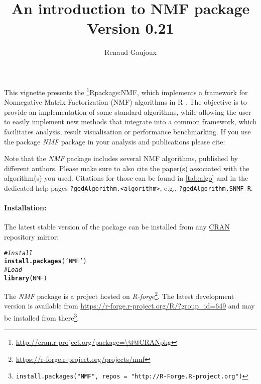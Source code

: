 \documentclass[a4paper]{article}\usepackage[]{graphicx}\usepackage[]{color}
\makeatletter
\newcommand{\hlstr}[1]{\textcolor[rgb]{0.192,0.494,0.8}{#1}}%
\newcommand{\hlcom}[1]{\textcolor[rgb]{0.678,0.584,0.686}{\textit{#1}}}%
\newcommand{\hlstd}[1]{\textcolor[rgb]{0.345,0.345,0.345}{#1}}%
\newcommand{\hlkwd}[1]{\textcolor[rgb]{0.737,0.353,0.396}{\textbf{#1}}}%
\newenvironment{kframe}{%
 \def\at@end@of@kframe{}%
 \ifinner\ifhmode%
  \def\at@end@of@kframe{\end{minipage}}%
  \begin{minipage}{\columnwidth}%
 \fi\fi%
 \def\FrameCommand##1{\hskip\@totalleftmargin \hskip-\fboxsep
 \colorbox{shadecolor}{##1}\hskip-\fboxsep
     \hskip-\linewidth \hskip-\@totalleftmargin \hskip\columnwidth}%
 \MakeFramed {\advance\hsize-\width
   \@totalleftmargin\z@ \linewidth\hsize
   \@setminipage}}%
 {\par\unskip\endMakeFramed%
 \at@end@of@kframe}
\newenvironment{knitrout}{}{} %
\let\code=\texttt
\newcommand{\pkgname}[1]{\textit{#1}\xspace}
\newcommand{\Rpkg}[1]{\pkgname{#1} package\xspace}
\newcommand{\CRANurl}[1]{\url{http://cran.r-project.org/package=#1}}
\def\CRANpkg{\@ifstar\@CRANpkg\@@CRANpkg}
\def\@CRANpkg#1{\href{http://cran.r-project.org/package=#1}{\pkgname{#1}}\footnote{\CRANurl{#1}}}
\def\@@CRANpkg#1{\href{http://cran.r-project.org/package=#1}{\pkgname{#1}} package\footnote{\CRANurl{#1}}}
\def\citeCRANpkg{\@ifstar\@citeCRANpkg\@@citeCRANpkg}
\def\@citeCRANpkg#1{\CRANpkg{#1}\cite*{Rpackage:#1}}
\def\@@citeCRANpkg#1{\CRANpkg{#1}~\cite{Rpackage:#1}}
\newcommand{\nmfpack}{\Rpkg{NMF}}
\renewcommand{\cite}[1]{\parencite{#1}}
\makeatother
\begin{document}
\title{An introduction to NMF package\\
\small Version 0.21}
\author{Renaud Gaujoux}

\maketitle

This vignette presents the \citeCRANpkg{NMF}, which implements a framework
for Nonnegative Matrix Factorization (NMF) algorithms in R \cite{R}.
The objective is to provide an implementation of some standard algorithms, while
allowing the user to easily implement new methods that integrate into a
common framework, which facilitates analysis, result visualisation or
performance benchmarking.
If you use the package \nmfpack in your analysis and publications please cite:

\bigskip
{}

Note that the \nmfpack includes several NMF algorithms, published by different
authors.
Please make sure to also cite the paper(s) associated with the algorithm(s)
you used.
Citations for those can be found in \cref{tab:algo} and in the dedicated help
pages \code{?gedAlgorithm.<algorithm>}, e.g., \code{?gedAlgorithm.SNMF\_R}.

\bigskip
\paragraph{Installation:} The latest stable version of the package can be installed from any
\href{http://cran.r-project.org}{CRAN} repository mirror:
\begin{knitrout}
\color{fgcolor}\begin{kframe}
\begin{alltt}
\hlcom{# Install}
\hlkwd{install.packages}\hlstd{(}\hlstr{'NMF'}\hlstd{)}
\hlcom{# Load}
\hlkwd{library}\hlstd{(NMF)}
\end{alltt}
\end{kframe}
\end{knitrout}
The \nmfpack is a project hosted on \emph{R-forge}\footnote{\url{https://r-forge.r-project.org/projects/nmf}}.
The latest development version is available from \url{https://r-forge.r-project.org/R/?group_id=649} and may be installed from there\footnote{\code{install.packages("NMF", repos = "http://R-Forge.R-project.org")}}.
\end{document}
